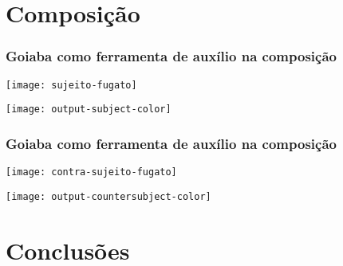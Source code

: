 \documentclass{beamer}
\begin{document}
\section{Composição}

\begin{frame}[fragile]
  \frametitle{Goiaba como ferramenta de auxílio na composição}
    \texttt{[image: sujeito-fugato]}

    \texttt{[image: output-subject-color]}
\end{frame}

\begin{frame}[fragile]
  \frametitle{Goiaba como ferramenta de auxílio na composição}
    \texttt{[image: contra-sujeito-fugato]}

    \texttt{[image: output-countersubject-color]}
\end{frame}

\section{Conclusões}


\renewcommand{\refname}{Referências}



\end{document}
